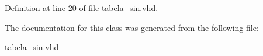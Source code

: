 Definition at line \hyperlink{tabela__sin_8vhd_source_l00020}{20} of file \hyperlink{tabela__sin_8vhd_source}{tabela\+\_\+sin.\+vhd}.



The documentation for this class was generated from the following file\+:\begin{DoxyCompactItemize}
\item 
\hyperlink{tabela__sin_8vhd}{tabela\+\_\+sin.\+vhd}\end{DoxyCompactItemize}
